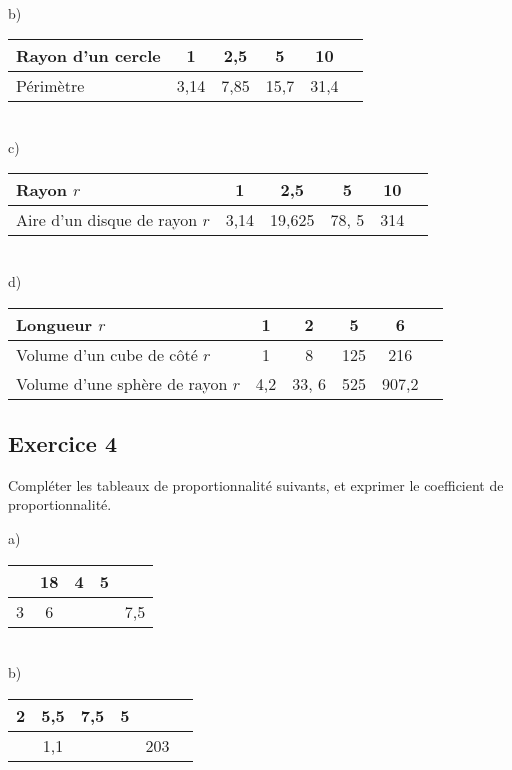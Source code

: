 \documentclass[12 pt]{extarticle}
\theoremstyle{plain}
\begin{document}
 \ \\ 
 
b) \begin{tabular}{|l | c | c | c | c | c}
\hline
Rayon d'un cercle & 1 & 2,5 &  5 & 10 \\
\hline
Périmètre & 3,14 &7,85 & 15,7& 31,4\\ \hline

\end{tabular}

 \ \\ 
 
 
c) \begin{tabular}{|l | c | c | c | c | c}
\hline
Rayon $r$ & 1 & 2,5 &  5 & 10 \\
\hline
Aire d'un disque de rayon $r$ & 3,14 & 19,625 & 78, 5& 314\\ \hline

\end{tabular}

 \ \\ 
 
d) \begin{tabular}{|l | c | c | c | c | c}
\hline
Longueur $r$ & 1 & 2 &  5 & 6 \\
\hline
Volume d'un cube de côté $r$ & 1 & 8 & 125 & 216 \\ \hline
Volume d'une sphère de rayon $r$ & 4,2 & 33, 6 & 525& 907,2\\ \hline

\end{tabular}
 
 
 \subsection*{Exercice 4}

Compléter les tableaux de proportionnalité suivants, et exprimer le coefficient de proportionnalité. 

a) \begin{tabular}{ | c |c | c| c|c| }\hline
 & 18  & 4 & 5 & \\
 \hline
 3 & 6 &  &  & 7,5 \\ \hline
\end{tabular} 

 \ \\ 
 
b) \begin{tabular}{|c | c | c | c | c | c}
\hline
2 & 5,5  & 7,5 &  5 &  \\
\hline
 & 1,1 & & &203 \\ \hline

\end{tabular}
\end{document}
